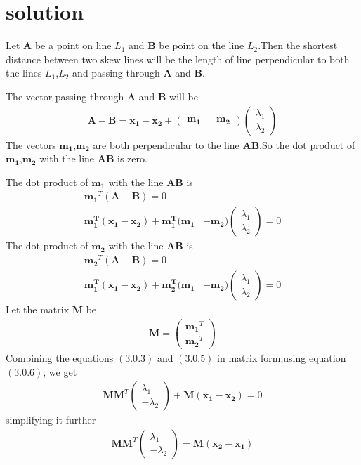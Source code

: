\documentclass[journal,12pt,twocolumn]{IEEEtran}
\providecommand{\brak}[1]{\ensuremath{\left(#1\right)}}
\newcommand{\myvec}[1]{\ensuremath{\begin{pmatrix}#1\end{pmatrix}}}
\numberwithin{equation}{subsection}
\let\vec\mathbf
\begin{document}
\section{solution}
Let $\vec{A}$ be a point on line $L_1$ and $\vec{B}$ be point on the line $L_2$.Then the shortest distance between two skew lines will be the length of line perpendicular to both the lines $L_1$,$L_2$ and passing through $\vec{A}$ and $\vec{B}$.\par
The vector passing through $\vec{A}$ and $\vec{B}$ will be \\
\begin{align}
    \vec{A-B}=\vec{x_1-x_2}+\myvec{\vec{m_1} & -\vec{m_2}}\myvec{\lambda_1\\\lambda_2}
\end{align}
The vectors $\vec{m_1}$,$\vec{m_2}$ are both perpendicular to the line $\vec{AB}$.So the dot product of $\vec{m_1}$,$\vec{m_2}$ with the line $\vec{AB}$ is zero.\par
The dot product of $\vec{m_1}$ with the line $\vec{AB}$ is
\begin{align}
    \vec{m_1}^T\brak{\vec{A-B}}=0\\
    \vec{m_1^T}(\vec{x_1-x_2})+\vec{m_1^T}(\vec{m_1} & -\vec{m_2})\begin{pmatrix}\lambda_1 \\ \lambda_2\end{pmatrix}=0
\end{align}
The dot product of $\vec{m_2}$ with the line $\vec{AB}$ is\\
\begin{align}
    \vec{m_2}^T\brak{\vec{A-B}}=0\\
    \vec{m_1^T}(\vec{x_1-x_2})+\vec{m_2^T}(\vec{m_1} & -\vec{m_2})\myvec{\lambda_1 \\ \lambda_2}=0
\end{align}
Let the matrix $\vec{M}$ be\\
\begin{align}
    \vec{M}=\myvec{\vec{m_1}^T\\\vec{m_2}^T}
\end{align}
Combining the equations $(3.0.3)$ and $(3.0.5)$ in matrix form,using equation $(3.0.6)$, we get
\begin{align}
    \vec{M}\vec{M}^T\myvec{\lambda_1\\-\lambda_2}+\vec{M}\vec{(x_1-x_2)}=0
\end{align}
simplifying it further\\
\begin{align}
    \vec{M}\vec{M}^T\begin{pmatrix}\lambda_1\\-\lambda_2\end{pmatrix}=\vec{M}\vec{(x_2-x_1)}
\end{align}
\end{document}
